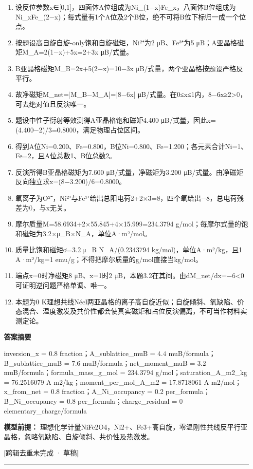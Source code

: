 \documentclass[UTF8,11pt,a4paper]{ctexart}
\begin{document}
\begin{enumerate}
\item 设反位参数x∈[0,1]，四面体A位组成为Ni\_(1−x)Fe\_x，八面体B位组成为Ni\_xFe\_(2−x)；每式量有1个A位及2个B位，绝不可将B位下标归一成一个位点。
\item 按题设高自旋自旋-only饱和自旋磁矩，Ni²⁺为2 μB、Fe³⁺为5 μB；A亚晶格磁矩M\_A=2(1−x)+5x=2+3x μB/式量。
\item B亚晶格磁矩M\_B=2x+5(2−x)=10−3x μB/式量，两个亚晶格按题设严格反平行。
\item 故净磁矩M\_net=|M\_B−M\_A|=|8−6x| μB/式量。在0≤x≤1内，8−6x≥2>0，可去绝对值且反演唯一。
\item 题设中性子衍射等效测得A亚晶格饱和磁矩4.400 μB/式量，因此x=(4.400−2)/3=0.8000，满足物理占位区间。
\item 得到A位Ni=0.200、Fe=0.800，B位Ni=0.800、Fe=1.200；各元素合计Ni=1、Fe=2，且A位总数1、B位总数2。
\item 反演所得B亚晶格磁矩为7.600 μB/式量，净磁矩为3.200 μB/式量。由净磁矩反向独立求x=(8−3.200)/6=0.8000。
\item 氧离子为O²⁻，Ni²⁺与Fe³⁺给出总阳电荷2+2×3=8，四个氧给出−8，总电荷残差为0，与x无关。
\item 摩尔质量M=58.6934+2×55.845+4×15.999=234.3794 g/mol；每摩尔式量的饱和磁矩为3.2×μ\_B×N\_A，单位A·m²/mol。
\item 质量比饱和磁矩σ=3.2 μ\_B N\_A/(0.2343794 kg/mol)，单位A·m²/kg，且1 A·m²/kg=1 emu/g；不得把摩尔质量的g/mol直接当kg/mol。
\item 端点x=0时净磁矩8 μB、x=1时2 μB，本题3.2在其间。由dM\_net/dx=−6<0可证明逆问题严格单调、唯一。
\item 本题为0 K理想共线Néel两亚晶格的离子高自旋近似；自旋倾斜、氧缺陷、价态混合、温度激发及共价性都会使真实磁矩和占位反演偏离，不可当作材料实测定论。
\end{enumerate}
\noindent\textbf{答案摘要}\par
inversion\_x = 0.8 fraction；A\_sublattice\_muB = 4.4 muB/formula；B\_sublattice\_muB = 7.6 muB/formula；net\_moment\_muB = 3.2 muB/formula；formula\_mass\_g\_mol = 234.3794 g/mol；saturation\_A\_m2\_kg = 76.2516079 A m2/kg；moment\_per\_mol\_A\_m2 = 17.8718061 A m2/mol；x\_from\_net = 0.8 fraction；A\_Ni\_occupancy = 0.2 per\_formula；B\_Ni\_occupancy = 0.8 per\_formula；charge\_residual = 0 elementary\_charge/formula\par
\noindent\textbf{模型前提：}
理想化学计量NiFe2O4，Ni2+、Fe3+高自旋，零温刚性共线反平行亚晶格，忽略氧缺陷、自旋倾斜、共价性及热激发。\par
\noindent\textcolor{red!65!black}{[跨辑去重未完成 · 草稿]} \par
\medskip\hrule\medskip
{}
\end{document}
